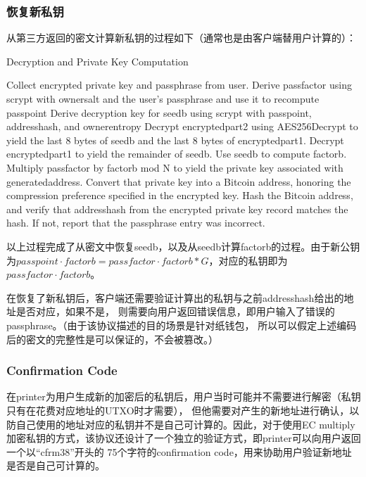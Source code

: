 \subsubsection{恢复新私钥}
从第三方返回的密文计算新私钥的过程如下（通常也是由客户端替用户计算的）：

\begin{algorithm}[tbp]\footnotesize
\caption{Decryption and Private Key Computation}
  	\begin{algorithmic}[1]
	   \STATE  Collect encrypted private key and passphrase from user.
	   \STATE  Derive passfactor using scrypt with ownersalt and the user's 
	   passphrase and use it to recompute passpoint
	   \STATE Derive decryption key for seedb using scrypt with passpoint, 
	   addresshash, and ownerentropy
		\STATE Decrypt encryptedpart2 using AES256Decrypt to yield the last 
		8 bytes of seedb and the last 8 bytes of encryptedpart1.
		\STATE Decrypt encryptedpart1 to yield the remainder of seedb.
		\STATE Use seedb to compute factorb.
		\STATE Multiply passfactor by factorb mod N to yield the private key 
		associated with generatedaddress.
		\STATE C\STATE onvert that private key into a Bitcoin address, honoring 
		the compression preference specified in the encrypted key.
		\STATE Hash the Bitcoin address, and verify that addresshash from the 
		encrypted private key record matches the hash. If not, report that the 
		passphrase entry was incorrect.
    \end{algorithmic}
\end{algorithm}

以上过程完成了从密文中恢复seedb，以及从seedb计算factorb的过程。由于新公钥为$passpoint\cdot 
factorb=passfactor\cdot factorb *G$，对应的私钥即为$passfactor\cdot factorb$。

在恢复了新私钥后，客户端还需要验证计算出的私钥与之前addresshash给出的地址是否对应，如果不是，
则需要向用户返回错误信息，即用户输入了错误的passphrase。（由于该协议描述的目的场景是针对纸钱包，
所以可以假定上述编码后的密文的完整性是可以保证的，不会被篡改。）


\subsubsection{ Confirmation Code}
在printer为用户生成新的加密后的私钥后，用户当时可能并不需要进行解密（私钥只有在花费对应地址的UTXO时才需要），
但他需要对产生的新地址进行确认，以防自己使用的地址对应的私钥并不是自己可计算的。因此，对于使用EC multiply加密私钥的方式，该协议还设计了一个独立的验证方式，即printer可以向用户返回一个以“cfrm38”开头的
75个字符的confirmation code，用来协助用户验证新地址是否是自己可计算的。
 
